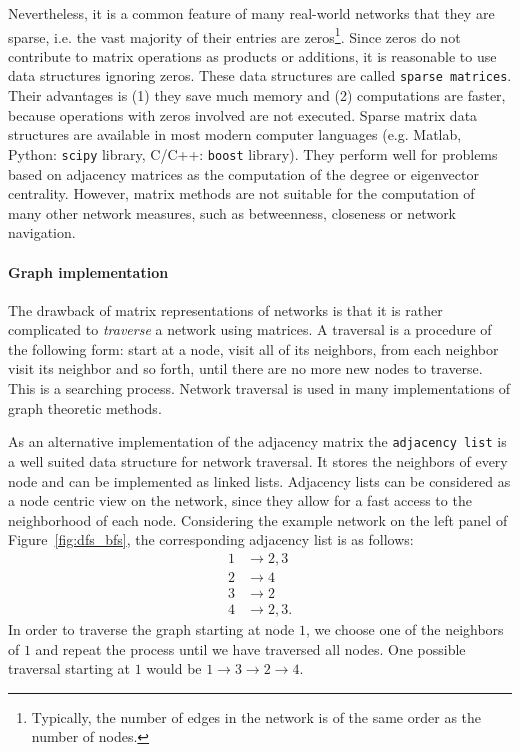 Nevertheless, it is a common feature of many real-world networks that they are sparse, i.e. the vast majority of their entries are zeros\footnote{Typically, the number of edges in the network is of the same order as the number of nodes.}.
Since zeros do not contribute to matrix operations as products or additions, it is reasonable to use data structures ignoring zeros.
These data structures are called \verb"sparse matrices".
Their advantages is (1) they save much memory and (2) computations are faster, because operations with zeros involved are not executed.
Sparse matrix data structures are available in most modern computer languages (e.g. Matlab, Python: \verb"scipy" library, C/C++: \verb"boost" library).
They perform well for problems based on adjacency matrices as the computation of the degree or eigenvector centrality.
However, matrix methods are not suitable for the computation of many other network measures, such as betweenness, closeness or network navigation.

\paragraph{Graph implementation\color{Cayenne}{.}}
The drawback of matrix representations of networks is that it is rather complicated to \emph{traverse} a network using matrices.
A traversal is a procedure of the following form: start at a node, visit all of its neighbors, from each neighbor visit its neighbor and so forth, until there are no more new nodes to traverse.
This is a searching process.
Network traversal is used in many implementations of graph theoretic methods.

As an alternative implementation of the adjacency matrix the \verb"adjacency list" is a well suited data structure for network traversal.
It stores the neighbors of every node and can be implemented as linked lists.
Adjacency lists can be considered as a node centric view on the network, since they allow for a fast access to the neighborhood of each node.
Considering the example network on the left panel of Figure~\ref{fig:dfs_bfs}, the corresponding adjacency list is as follows:
\begin{align*}
1 &\rightarrow 2,3 \\
2 &\rightarrow 4 \\
3 &\rightarrow 2 \\
4 &\rightarrow 2,3 .
\end{align*}
In order to traverse the graph starting at node $1$, we choose one of the neighbors of $1$ and repeat the process until we have traversed all nodes.
One possible traversal starting at $1$ would be $1\rightarrow 3 \rightarrow 2 \rightarrow 4$.

